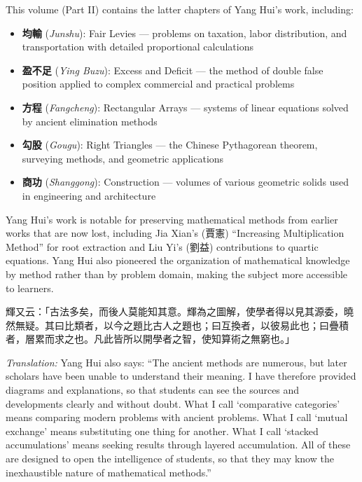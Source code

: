 \documentclass[11pt,a4paper]{article}
\newcommand{\zh}[1]{{#1}}
\newenvironment{chpassage}{%
  \par\medskip
  \begin{center}
  \begin{minipage}{0.95\textwidth}
  \setlength{\parindent}{2em}
  \linespread{1.3}\selectfont
}{%
  \end{minipage}
  \end{center}
  \medskip
}
\begin{document}
This volume (Part II) contains the latter chapters of Yang Hui's work,
including:
\begin{itemize}[leftmargin=2em]
  \item \textbf{\zh{均輸}} (\textit{Junshu}): Fair Levies --- problems on
  taxation, labor distribution, and transportation with detailed proportional
  calculations
  \item \textbf{\zh{盈不足}} (\textit{Ying Buzu}): Excess and Deficit ---
  the method of double false position applied to complex commercial and
  practical problems
  \item \textbf{\zh{方程}} (\textit{Fangcheng}): Rectangular Arrays ---
  systems of linear equations solved by ancient elimination methods
  \item \textbf{\zh{勾股}} (\textit{Gougu}): Right Triangles --- the
  Chinese Pythagorean theorem, surveying methods, and geometric applications
  \item \textbf{\zh{商功}} (\textit{Shanggong}): Construction --- volumes
  of various geometric solids used in engineering and architecture
\end{itemize}

Yang Hui's work is notable for preserving mathematical methods from earlier
works that are now lost, including Jia Xian's (\zh{賈憲}) ``Increasing
Multiplication Method'' for root extraction and Liu Yi's (\zh{劉益})
contributions to quartic equations. Yang Hui also pioneered the organization of
mathematical knowledge by method rather than by problem domain, making the
subject more accessible to learners.

\begin{chpassage}
\zh{輝又云：「古法多矣，而後人莫能知其意。輝為之圖解，使學者得以見其源委，曉然無疑。其曰比類者，以今之題比古人之題也；曰互換者，以彼易此也；曰疊積者，層累而求之也。凡此皆所以開學者之智，使知算術之無窮也。」}

\medskip
\textit{Translation:} Yang Hui also says: ``The ancient methods are numerous,
but later scholars have been unable to understand their meaning. I have
therefore provided diagrams and explanations, so that students can see the
sources and developments clearly and without doubt. What I call `comparative
categories' means comparing modern problems with ancient problems. What I call
`mutual exchange' means substituting one thing for another. What I call
`stacked accumulations' means seeking results through layered accumulation. All
of these are designed to open the intelligence of students, so that they may
know the inexhaustible nature of mathematical methods.''
\end{chpassage}
\end{document}
